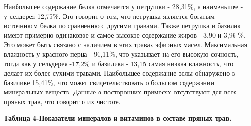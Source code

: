 \begin{multicols}{2}
Наибольшее содержание белка отмечается у петрушки - 28,31\%, а
наименьшее - у селдерея 12,75\%. Это говорит о том, что петрушка
является богатым источником белка по сравнению с другими травами. Также
петрушка и базилик имеют примерно одинаковое и самое высокое содержание
жиров - 3,90 и 3,96 \%. Это может быть связано с наличием в этих травах
эфирных масел. Максимальная влажность у красного перца - 90,11\%, что
указывает на его высокую сочность, тогда как у сельдерея -17,2\% и
базилика - 13,15 самая низкая влажность, что делает их более сухими
травами. Наибольшее содержание золы обнаружено в базилике 15,41\%, что
может свидетельствовать о большом содержании минеральных веществ. Данные
о посторонних примесях отсутствуют для всех пряных трав, что говорит о
их чистоте.
\end{multicols}

{\bfseries Таблица 4-Показатели минералов и витаминов в составе пряных
трав.}

